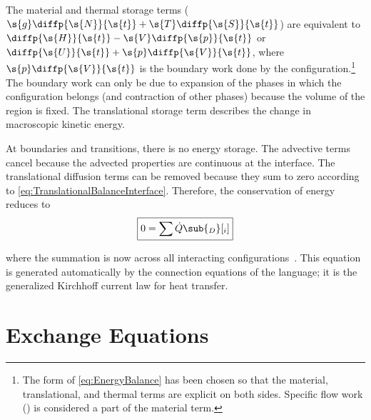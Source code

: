 The material and thermal storage terms ($\s{g}\diffp{\s{N}}{\s{t}} + \s{T}\diffp{\s{S}}{\s{t}}$) are equivalent to $\diffp{\s{H}}{\s{t}} - \s{V}\diffp{\s{p}}{\s{t}}$ or $\diffp{\s{U}}{\s{t}} + \s{p}\diffp{\s{V}}{\s{t}}$, where $\s{p}\diffp{\s{V}}{\s{t}}$ is the boundary work done by the configuration.\footnote{The form of \autoref{eq:EnergyBalance} has been chosen so that the material, translational, and thermal terms are explicit on both sides.  Specific flow work () is considered a part of the material term.}  The boundary work can only be due to expansion of the phases in which the configuration belongs (and contraction of other phases) because the volume of the region is fixed.  The translational storage term describes the change in macroscopic kinetic energy.


At boundaries and transitions, there is no energy storage.  The advective terms cancel because the advected properties are continuous at the interface.  The translational diffusion terms can be removed because they sum to zero according to \autoref{eq:TranslationalBalanceInterface}.  Therefore, the conservation of energy reduces to
\begin{equation}
  \label{eq:ThermalBalanceInterface}
  \boxed{0 = \sum\dot{Q}\sub{_D}[_i]}
\end{equation}

where the summation is now across all interacting configurations~.  This equation is generated automatically by the connection equations of the  language; it is the generalized Kirchhoff current law for heat transfer.


\section{Exchange Equations}
\label{sec:Exchange}

